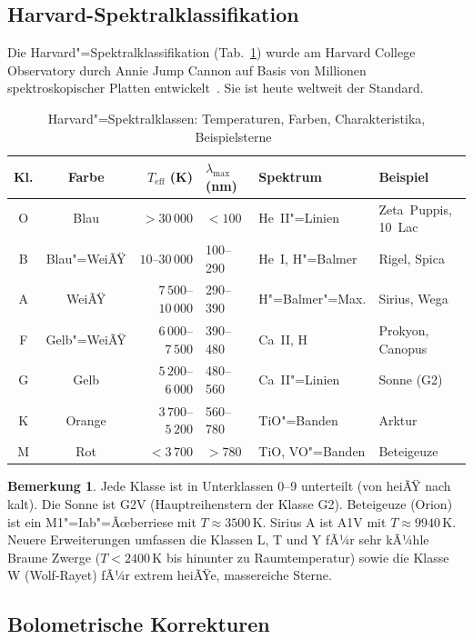 ﻿\documentclass[a4paper,12pt]{article}
\theoremstyle{definition}
\newtheorem{bemerkung}{Bemerkung}
\begin{document}
\subsection{Harvard-Spektralklassifikation}

Die Harvard"=Spektralklassifikation (Tab.~\ref{tab:spektral}) wurde am
Harvard College Observatory durch Annie Jump Cannon auf Basis
von Millionen spektroskopischer Platten entwickelt~\cite{cannon1901}.
Sie ist heute weltweit der Standard.

\begin{table}[ht]
\centering
\caption{Harvard"=Spektralklassen: Temperaturen, Farben, Charakteristika,
Beispielsterne~\cite{allen2000}}
\label{tab:spektral}
\begin{tabular}{ccrllp{3.5cm}}
\toprule
\textbf{Kl.} & \textbf{Farbe} & \textbf{$T_{\text{eff}}$ (K)} &
\textbf{$\lambda_{\max}$ (nm)} & \textbf{Spektrum} & \textbf{Beispiel} \\
\midrule
O & Blau & $>30\,000$ & $< 100$ & He~II"=Linien & Zeta~Puppis, 10~Lac \\
B & Blau"=WeiÃŸ & $10$--$30\,000$ & 100--290 & He~I, H"=Balmer & Rigel, Spica \\
A & WeiÃŸ & $7\,500$--$10\,000$ & 290--390 & H"=Balmer"=Max. & Sirius, Wega \\
F & Gelb"=WeiÃŸ & $6\,000$--$7\,500$ & 390--480 & Ca~II, H & Prokyon, Canopus \\
G & Gelb & $5\,200$--$6\,000$ & 480--560 & Ca~II"=Linien & Sonne (G2) \\
K & Orange & $3\,700$--$5\,200$ & 560--780 & TiO"=Banden & Arktur \\
M & Rot & $< 3\,700$ & $> 780$ & TiO, VO"=Banden & Beteigeuze \\
\bottomrule
\end{tabular}
\end{table}

\begin{bemerkung}
    Jede Klasse ist in Unterklassen 0--9 unterteilt (von heiÃŸ nach kalt).
    Die Sonne ist G2V (Hauptreihenstern der Klasse G2). Beteigeuze
    (Orion) ist ein M1"=Iab"=Ãœberriese mit $T \approx 3500\,\text{K}$.
    Sirius A ist A1V mit $T \approx 9940\,\text{K}$.
    Neuere Erweiterungen umfassen die Klassen L, T und Y fÃ¼r sehr kÃ¼hle
    Braune Zwerge ($T < 2400\,\text{K}$ bis hinunter zu Raumtemperatur)
    sowie die Klasse W (Wolf-Rayet) fÃ¼r extrem heiÃŸe, massereiche Sterne.
\end{bemerkung}

\subsection{Bolometrische Korrekturen}
\end{document}
